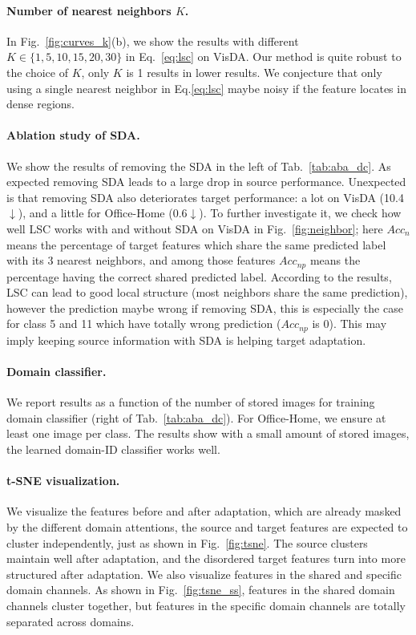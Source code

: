 \documentclass[10pt,twocolumn,letterpaper]{article}
\begin{document}
\vspace{-2mm}
\paragraph{Number of nearest neighbors $K$.} In Fig.~\ref{fig:curves_k}(b), we show the results with different $K \in \{1,5,10,15,20,30\}$ in Eq.~\ref{eq:lsc} on VisDA. Our method is quite robust to the choice of $K$, only $K$ is 1 results in lower results. We conjecture that only using a single nearest neighbor in Eq.\ref{eq:lsc} maybe noisy if the feature locates in dense regions.  

\vspace{-2mm}
\paragraph{Ablation study of SDA.} We show the results of removing the SDA in the left of Tab.~\ref{tab:aba_dc}. As expected removing SDA leads to a large drop in source performance. Unexpected is that removing SDA also deteriorates target performance: a lot on VisDA (10.4$\downarrow$), and a little for Office-Home (0.6$\downarrow$). To further investigate it, we check how well LSC works with and without SDA on VisDA in Fig.~\ref{fig:neighbor}; here $Acc_n$ means the percentage of target features which share the same predicted label with its 3 nearest neighbors, and among those features $Acc_{np}$ means the percentage having the correct shared predicted label. According to the results, LSC can lead to good local structure (most neighbors share the same prediction), however the prediction maybe wrong if removing SDA, this is especially the case for class 5 and 11 which have totally wrong prediction ($Acc_{np}$ is 0). This may imply keeping source information with SDA is helping target adaptation.

\vspace{-2mm}
\paragraph{Domain classifier.} {We report results as a function of the number of stored images for training domain classifier (right of Tab.~\ref{tab:aba_dc}). For Office-Home, we ensure at least one image per class. The results show with a small amount of stored images, the learned domain-ID classifier works well.
}

\vspace{-2mm}
\paragraph{t-SNE visualization.} We visualize the features before and after adaptation, which are already masked by the different domain attentions, the source and target features are expected to cluster independently, just as shown in Fig.~\ref{fig:tsne}. The source clusters maintain well after adaptation, and the disordered target features turn into more structured after adaptation. We also visualize features in the shared and specific domain channels. As shown in Fig.~\ref{fig:tsne_ss}, features in the shared domain channels cluster together, but features in the specific domain channels are totally separated across domains.
\end{document}
